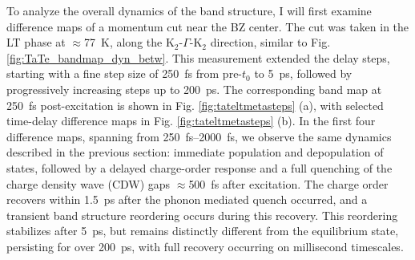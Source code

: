 To analyze the overall dynamics of the band structure, I will first examine difference maps of a momentum cut near the BZ center.
The cut was taken in the LT phase at $\approx$\qty{77}{\kelvin}, along the K$_2$-$\Gamma$-K$_2$ direction, similar to Fig. \ref{fig:TaTe_bandmap_dyn_betw}.
This measurement extended the delay steps, starting with a fine step size of \qty{250}{\femto\second} from pre-$t_0$ to \qty{5}{\pico\second}, followed by progressively increasing steps up to \qty{200}{\pico\second}.
The corresponding band map at \qty{250}{\femto\second} post-excitation is shown in Fig. \ref{fig:tateltmetasteps} (a), with selected time-delay difference maps in Fig. \ref{fig:tateltmetasteps} (b).
In the first four difference maps, spanning from \qtyrange{250}{2000}{\femto\second}, we observe the same dynamics described in the previous section: immediate population and depopulation of states, followed by a delayed charge-order response and a full quenching of the charge density wave (CDW) gaps $\approx$\qty{500}{\femto\second} after excitation.
The charge order recovers within \qty{1.5}{\pico\second} after the phonon mediated quench occurred, and a transient band structure reordering occurs during this recovery.
This reordering stabilizes after \qty{5}{\pico\second}, but remains distinctly different from the equilibrium state, persisting for over \qty{200}{\pico\second}, with full recovery occurring on millisecond timescales.

